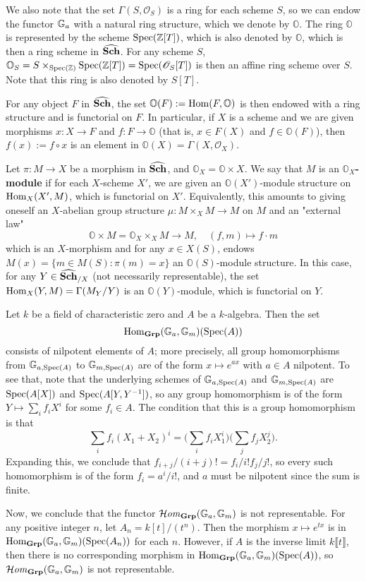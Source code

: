We also note that the set $\Gamma(S,\mathscr{O}_S)$ is a ring for each scheme $S$, so we can endow the functor $\mathbb{G}_a$ with a natural ring structure, which we denote by $\mathbb{O}$. The ring $\mathbb{O}$ is represented by the scheme $\mathrm{Spec}(\mathbb{Z}[T])$, which is also denoted by $\mathbb{O}$, which is then a ring scheme in $\widehat{\mathbf{Sch}}$. For any scheme $S$, $\mathbb{O}_S=S\times_{\mathrm{Spec}(\mathbb{Z})}\mathrm{Spec}(\mathbb{Z}[T])=\mathrm{Spec}(\mathscr{O}_S[T])$ is then an affine ring scheme over $S$. Note that this ring is also denoted by $S[T]$.\par
For any object $F$ in $\widehat{\mathbf{Sch}}$, the set $\mathbb{O}(F):=\mathrm{Hom}(F,\mathbb{O})$ is then endowed with a ring structure and is functorial on $F$. In particular, if $X$ is a scheme and we are given morphisms $x:X\to F$ and $f:F\to\mathbb{O}$ (that is, $x\in F(X)$ and $f\in\mathbb{O}(F)$), then $f(x):=f\circ x$ is an element in $\mathbb{O}(X)=\Gamma(X,\mathscr{O}_X)$.

\begin{definition}
Let $\pi:M\to X$ be a morphism in $\widehat{\mathbf{Sch}}$, and $\mathbb{O}_X=\mathbb{O}\times X$. We say that $M$ is an \textbf{$\mathbb{O}_X$-module} if for each $X$-scheme $X'$, we are given an $\mathbb{O}(X')$-module structure on $\mathrm{Hom}_X(X',M)$, which is functorial on $X'$. Equivalently, this amounts to giving oneself an $X$-abelian group structure $\mu:M\times_XM\to M$ on $M$ and an "external law"
\[\mathbb{O}\times M=\mathbb{O}_X\times_XM\to M,\quad (f,m)\mapsto f\cdot m\]
which is an $X$-morphism and for any $x\in X(S)$, endows $M(x)=\{m\in M(S):\pi(m)=x\}$ an $\mathbb{O}(S)$-module structure. In this case, for any $Y\in\widehat{\mathbf{Sch}}_{/X}$ (not necessarily representable), the set $\mathrm{Hom}_X(Y,M)=\Gamma(M_Y/Y)$ is an $\mathbb{O}(Y)$-module, which is functorial on $Y$.
\end{definition}

\begin{example}
Let $k$ be a field of characteristic zero and $A$ be a $k$-algebra. Then the set
\[\mathrm{Hom}_{\mathbf{Grp}}(\mathbb{G}_a,\mathbb{G}_m)(\mathrm{Spec}(A))\]
consists of nilpotent elements of $A$; more precisely, all group homomorphisms from $\mathbb{G}_{a,\mathrm{Spec}(A)}$ to $\mathbb{G}_{m,\mathrm{Spec}(A)}$ are of the form $x\mapsto e^{ax}$ with $a\in A$ nilpotent. To see that, note that the underlying schemes of $\mathbb{G}_{a,\mathrm{Spec}(A)}$ and $\mathbb{G}_{m,\mathrm{Spec}(A)}$ are $\mathrm{Spec}(A[X])$ and $\mathrm{Spec}(A[Y,Y^{-1}])$, so any group homomorphism is of the form $Y\mapsto\sum_if_iX^i$ for some $f_i\in A$. The condition that this is a group homomorphism is that
\[\sum_if_i(X_1+X_2)^i=\Big(\sum_if_iX_1^i\Big)\Big(\sum_jf_jX_2^j\Big).\]
Expanding this, we conclude that $f_{i+j}/(i+j)!=f_i/i!f_j/j!$, so every such homomorphism is of the form $f_i=a^i/i!$, and $a$ must be nilpotent since the sum is finite.\par
Now, we conclude that the functor $\operatorname{\mathcal{H}\hspace*{-0.4pt}\textit{om}\hspace{0.5pt}}_{\mathbf{Grp}}(\mathbb{G}_a,\mathbb{G}_m)$ is not representable. For any positive integer $n$, let $A_n=k[t]/(t^n)$. Then the morphism $x\mapsto e^{tx}$ is in $\mathrm{Hom}_{\mathbf{Grp}}(\mathbb{G}_a,\mathbb{G}_m)(\mathrm{Spec}(A_n))$ for each $n$. However, if $A$ is the inverse limit $k\llbracket t\rrbracket$, then there is no corresponding morphism in $\mathrm{Hom}_{\mathbf{Grp}}(\mathbb{G}_a,\mathbb{G}_m)(\mathrm{Spec}(A))$, so $\operatorname{\mathcal{H}\hspace*{-0.4pt}\textit{om}\hspace{0.5pt}}_{\mathbf{Grp}}(\mathbb{G}_a,\mathbb{G}_m)$ is not representable.
\end{example}

